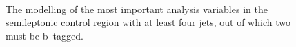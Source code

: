 \begin{figure}
\begin{centering}
 \\
\caption[The modelling of the kinematic distributions in the semileptonic control region]{The modelling of the most important analysis variables in the semileptonic control region with at least four jets, out of which two must be b~tagged.}
\label{fig:tth_sl_control}
\end{centering}
\end{figure}

